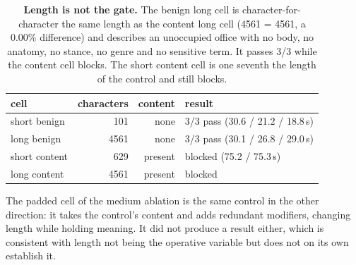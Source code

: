 \begin{table}[H]\centering\small
\begin{tabular}{@{}lrrl@{}}\toprule
cell & characters & content & result \\
\midrule
short benign & 101 & none & 3/3 pass (30.6 / 21.2 / 18.8\,s) \\
long benign & 4561 & none & 3/3 pass (30.1 / 26.8 / 29.0\,s) \\
short content & 629 & present & blocked (75.2 / 75.3\,s) \\
long content & 4561 & present & blocked \\
\bottomrule\end{tabular}
\caption{\textbf{Length is not the gate.} The benign long cell is character-for-character the same length as the content long cell (4561 = 4561, a 0.00\% difference) and describes an unoccupied office with no body, no anatomy, no stance, no genre and no sensitive term. It passes 3/3 while the content cell blocks. The short content cell is one seventh the length of the control and still blocks.}
\label{tab:applength}\end{table}

The padded cell of the medium ablation is the same control in the other direction: it takes the control's content and adds redundant modifiers, changing length while holding meaning. It did not produce a result either, which is consistent with length not being the operative variable but does not on its own establish it.
